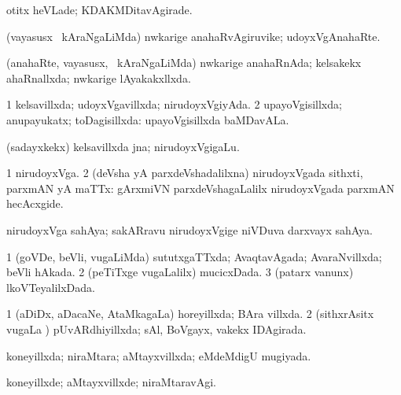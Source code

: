 {\bentry
{} 
\gl{\kirxvi}
\expl{}
\bmng
 otitx heVLade; KDAKMDitavAgirade. 
\emng
\eentry

\bentry
{} 
\gl{\nA}
\expl{}
\bmng
 (vayasusx \mo\ kAraNgaLiMda) nwkarige anahaRvAgiruvike; udoyxVgAnahaRte. 
\emng
\eentry

\bentry
{} 
\gl{\gu}
\expl{}
\bmng
 (anahaRte, vayasusx, \mo\ kAraNgaLiMda) nwkarige anahaRnAda; kelsakekx ahaRnallxda; nwkarige lAyakakxllxda. 
\emng
\eentry

\bentry
{} 
\gl{\gu}
\expl{}
\bmng
\bnum
\num{1} kelsavillxda; udoyxVgavillxda; nirudoyxVgiyAda. 
\num{2} upayoVgisillxda; anupayukatx; toDagisillxda:  upayoVgisillxda baMDavALa. 
\enum
\emng

\noindent
\gl{\pagu}
\expl{}
\bmng
  (sadayxkekx) kelsavillxda jna; nirudoyxVgigaLu. 
\emng
\eentry

\bentry
{} 
\gl{\nA}
\expl{}
\bmng
\bnum
\num{1} nirudoyxVga. 
\num{2} (deVsha yA parxdeVshadalilxna) nirudoyxVgada sithxti, parxmAN yA maTTx:  gArxmiVN parxdeVshagaLalilx nirudoyxVgada parxmAN hecAcxgide. 
\enum
\emng
\eentry


\bentry 
{}
\gl{\nA}
\expl{}
\bmng
 nirudoyxVga sahAya; sakARravu nirudoyxVgige niVDuva darxvayx sahAya. 
\emng
\eentry

\bentry
{} 
\gl{\gu}
\expl{}
\bmng
\bnum
\num{1} (goVDe, beVli, \mo vugaLiMda) sututxgaTTxda; AvaqtavAgada; AvaraNvillxda; beVli hAkada. 
\num{2} (peTiTxge \mo vugaLalilx) mucicxDada. 
\num{3} (patarx \mo vanunx) lkoVTeyalilxDada. 
\enum
\emng
\eentry

\bentry
{} 
\gl{\gu}
\expl{}
\bmng
\bnum
\num{1} (aDiDx, aDacaNe, AtaMkagaLa) horeyillxda; BAra villxda. 
\num{2} (sithxrAsitx \mo vugaLa \vi) pUvARdhiyillxda; sAl, BoVgayx, \mo vakekx IDAgirada. 
\enum
\emng
\eentry

\bentry
{} 
\gl{\gu}
\bmng
 koneyillxda; niraMtara; aMtayxvillxda; eMdeMdigU mugiyada. 
\emng
\eentry

\bentry
{} 
\gl{\kirxvi}
\expl{}
\bmng
 koneyillxde; aMtayxvillxde; niraMtaravAgi. 
\emng
\eentry

}
